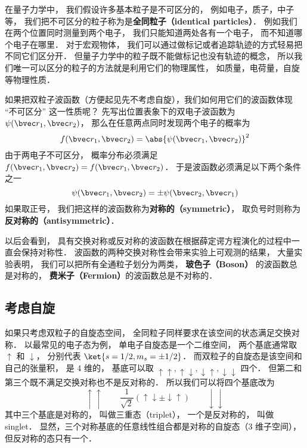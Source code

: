
在量子力学中， 我们假设许多基本粒子是不可区分的， 例如电子，质子，中子等， 我们把不可区分的粒子称为是\textbf{全同粒子（identical particles）}． 例如我们在两个位置同时测量到两个电子， 我们只能知道两处各有一个电子， 而不知道哪个电子在哪里． 对于宏观物体， 我们可以通过做标记或者追踪轨迹的方式轻易把不同它们区分开． 但量子力学中的粒子既不能做标记也没有轨迹的概念， 所以我们唯一可以区分的粒子的方法就是利用它们的物理属性， 如质量，电荷量，自旋等物理性质．

如果把双粒子波函数（方便起见先不考虑自旋），我们如何用它们的波函数体现 “不可区分” 这一性质呢？ 先写出位置表象下的双电子波函数为 $\psi(\bvec r_1, \bvec r_2)$， 那么在任意两点同时发现两个电子的概率为
$$
f(\bvec r_1, \bvec r_2) = \abs{\psi(\bvec r_1, \bvec r_2)}^2
$$
由于两电子不可区分， 概率分布必须满足 $f(\bvec r_1, \bvec r_2) = f(\bvec r_1, \bvec r_2)$． 于是波函数必须满足以下两个条件之一
\begin{equation}
\psi(\bvec r_1, \bvec r_2) = \pm \psi(\bvec r_2, \bvec r_1)
\end{equation}
如果取正号， 我们把这样的波函数称为\textbf{对称的（symmetric）}， 取负号时则称为\textbf{反对称的（antisymmetric）}．

以后会看到， 具有交换对称或反对称的波函数在根据薛定谔方程演化的过程中一直会保持对称性． 波函数的两种交换对称性会带来实验上可观测的结果， 大量实验表明， 我们可以把所有全通粒子划分为两类， \textbf{玻色子（Boson）} 的波函数总是对称的， \textbf{费米子（Fermion）}的波函数总是不对称的．

\subsection{考虑自旋}

如果只考虑双粒子的自旋态空间， 全同粒子同样要求在该空间的状态满足交换对称． 以最常见的电子态为例， 单电子自旋态是一个二维空间， 两个基底通常取 $\uparrow$ 和 $\downarrow$， 分别代表 $\ket{s=1/2,m_s=\pm 1/2}$． 而双粒子的自旋态是该空间和自己的张量积， 是 4 维的， 基底可以取 $\uparrow\uparrow, \uparrow\downarrow, \downarrow\uparrow, \downarrow\downarrow$ 四个． 但第二和第三个既不满足交换对称也不是反对称的． 所以我们可以将四个基底改为
\begin{equation}
\uparrow\uparrow \qquad \frac{1}{\sqrt 2}(\uparrow\downarrow \pm \downarrow\uparrow) \qquad \downarrow\downarrow
\end{equation}
其中三个基底是对称的， 叫做三重态（triplet）， 一个是反对称的， 叫做 singlet． 显然，三个对称基底的任意线性组合都是对称的自旋态（3 维子空间）， 但反对称的态只有一个．


